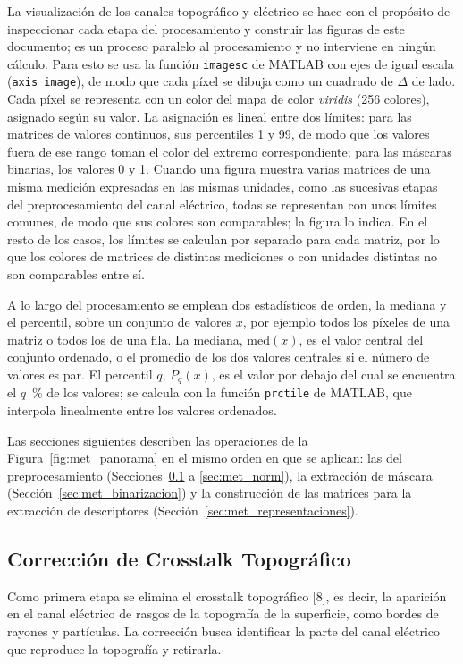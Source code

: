 La visualización de los canales topográfico y eléctrico se hace con el propósito de inspeccionar cada etapa del procesamiento y construir las figuras de este documento; es un proceso paralelo al procesamiento y no interviene en ningún cálculo. Para esto se usa la función \texttt{imagesc} de MATLAB con ejes de igual escala (\texttt{axis image}), de modo que cada píxel se dibuja como un cuadrado de $\Delta$ de lado. Cada píxel se representa con un color del mapa de color \emph{viridis} (256 colores), asignado según su valor. La asignación es lineal entre dos límites: para las matrices de valores continuos, sus percentiles 1 y 99, de modo que los valores fuera de ese rango toman el color del extremo correspondiente; para las máscaras binarias, los valores 0 y 1. Cuando una figura muestra varias matrices de una misma medición expresadas en las mismas unidades, como las sucesivas etapas del preprocesamiento del canal eléctrico, todas se representan con unos límites comunes, de modo que sus colores son comparables; la figura lo indica. En el resto de los casos, los límites se calculan por separado para cada matriz, por lo que los colores de matrices de distintas mediciones o con unidades distintas no son comparables entre sí.

A lo largo del procesamiento se emplean dos estadísticos de orden, la mediana y el percentil, sobre un conjunto de valores $x$, por ejemplo todos los píxeles de una matriz o todos los de una fila. La mediana, $\mathrm{med}(x)$, es el valor central del conjunto ordenado, o el promedio de los dos valores centrales si el número de valores es par. El percentil $q$, $P_q(x)$, es el valor por debajo del cual se encuentra el $q$~\% de los valores; se calcula con la función \texttt{prctile} de MATLAB, que interpola linealmente entre los valores ordenados.

Las secciones siguientes describen las operaciones de la Figura~\ref{fig:met_panorama} en el mismo orden en que se aplican: las del preprocesamiento (Secciones~\ref{sec:met_crosstalk} a \ref{sec:met_norm}), la extracción de máscara (Sección~\ref{sec:met_binarizacion}) y la construcción de las matrices para la extracción de descriptores (Sección~\ref{sec:met_representaciones}).

\subsection{Corrección de Crosstalk Topográfico}
\label{sec:met_crosstalk}

Como primera etapa se elimina el crosstalk topográfico [8], es decir, la aparición en el canal eléctrico de rasgos de la topografía de la superficie, como bordes de rayones y partículas. La corrección busca identificar la parte del canal eléctrico que reproduce la topografía y retirarla.

